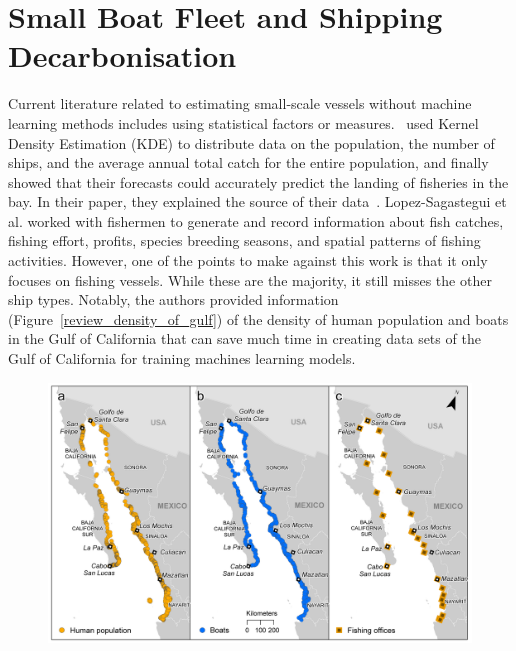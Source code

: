 
\section{Small Boat Fleet and Shipping Decarbonisation}
Current literature related to estimating small-scale vessels without machine learning methods includes using statistical factors or measures.~ used Kernel Density Estimation (KDE) to distribute data on the population, the number of ships, and the average annual total catch for the entire population, and finally showed that their forecasts could accurately predict the landing of fisheries in the bay. In their paper, they explained the source of their data~\cite{Lopez-Sagastegui2017Comparing}. Lopez-Sagastegui et al. worked with fishermen to generate and record information about fish catches, fishing effort, profits, species breeding seasons, and spatial patterns of fishing activities. However, one of the points to make against this work is that it only focuses on fishing vessels. While these are the majority, it still misses the other ship types. Notably, the authors provided information (Figure~\ref{review_density_of_gulf}) of the density of human population and boats in the Gulf of California that can save much time in creating data sets of the Gulf of California for training machines learning models.\\

\begin{figure}[t]
\center
\includegraphics[scale=0.83]{img/review_density_of_gulf.png}
\end{figure}

